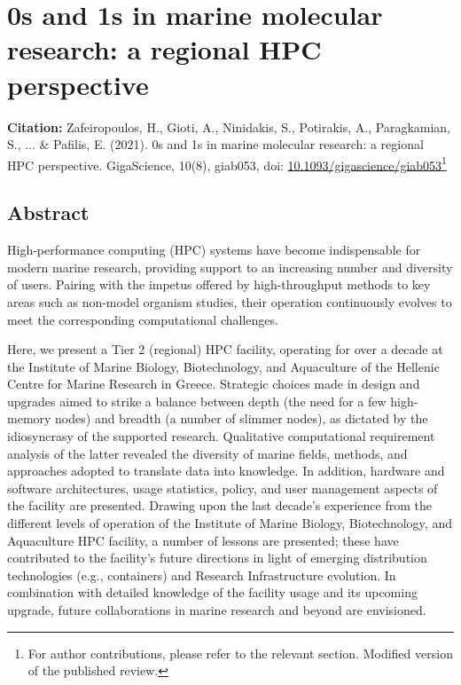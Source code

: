 % 
% 

\chapter{
   0s and 1s in marine molecular research: a regional HPC perspective
}
\label{cha:hpc}


\textbf{Citation:}
Zafeiropoulos, H., Gioti, A., Ninidakis, S., Potirakis, A., Paragkamian, S., ... \& 
Pafilis, E. (2021). 0s and 1s in marine molecular research: a regional HPC perspective. 
GigaScience, 10(8), giab053, doi: \href{https://doi.org/10.1093/gigascience/giab053}{10.1093/gigascience/giab053}\footnote{
   For author contributions, please refer to the relevant section. Modified version of the published review.
}


   \section{Abstract}
   High-performance computing (HPC) systems have become indispensable for modern marine research, 
   providing support to an increasing number and diversity of users. Pairing with the impetus 
   offered by high-throughput methods to key areas such as non-model organism studies, their 
   operation continuously evolves to meet the corresponding computational challenges. 

   Here, we present a Tier 2 (regional) HPC facility, operating for over a decade at the 
   Institute of Marine Biology, Biotechnology, and Aquaculture of the Hellenic Centre for Marine Research in Greece. 
   Strategic choices made in design and upgrades aimed to strike a balance between depth 
   (the need for a few high-memory nodes) and breadth (a number of slimmer nodes), as dictated by the 
   idiosyncrasy of the supported research. 
   Qualitative computational requirement analysis of the latter revealed the diversity of marine fields, 
   methods, and approaches adopted to translate data into knowledge. 
   In addition, hardware and software architectures, usage statistics, policy, and user management aspects 
   of the facility are presented. Drawing upon the last decade's experience from the different levels of operation 
   of the Institute of Marine Biology, Biotechnology, and Aquaculture HPC facility, a number of lessons are presented; 
   these have contributed to the facility's future directions in light of emerging distribution technologies (e.g., containers) 
   and Research Infrastructure evolution. 
   In combination with detailed knowledge of the facility usage and its upcoming upgrade, 
   future collaborations in marine research and beyond are envisioned.


